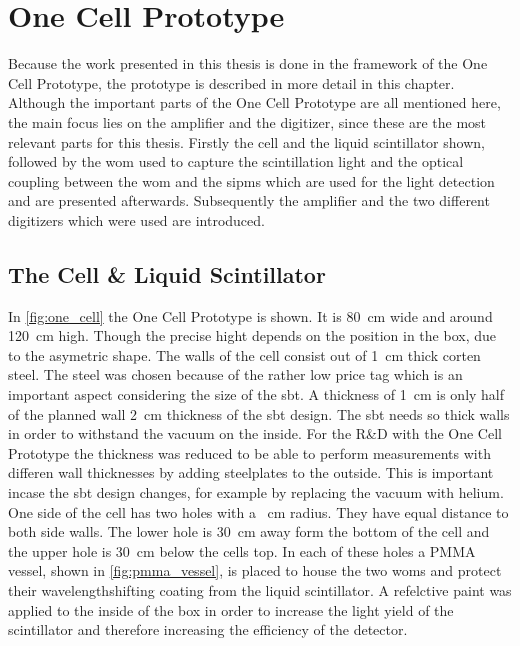 \chapter{One Cell Prototype}

Because the work presented in this thesis is done in the framework of the One Cell Prototype, the prototype is described in more detail in this chapter.
Although the important parts of the One Cell Prototype are all mentioned here, the main focus lies on the amplifier and the digitizer, since these are the most relevant parts for this thesis.
Firstly the cell and the liquid scintillator shown, followed by the \ac{wom} used to capture the scintillation light and the optical coupling between the \ac{wom} and the \acp{sipm} which are used for the light detection and are presented afterwards.
Subsequently the amplifier and the two different digitizers which were used are introduced.



\section{The Cell \& Liquid Scintillator}

In \autoref{fig:one_cell} the One Cell Prototype is shown.
It is \SI{80}{\centi\meter} wide and around \SI{120}{\centi\meter} high.
Though the precise hight depends on the position in the box, due to the asymetric shape.
The walls of the cell consist out of \SI{1}{\centi\meter} thick corten steel.
The steel was chosen because of the rather low price tag which is an important aspect considering the size of the \ac{sbt}.
A thickness of \SI{1}{\centi\meter} is only half of the planned wall \SI{2}{\centi\meter} thickness of the \ac{sbt} design.
The \ac{sbt} needs so thick walls in order to withstand the vacuum on the inside.
For the R\&D with the One Cell Prototype the thickness was reduced to be able to perform measurements with differen wall thicknesses by adding steelplates to the outside.
This is important incase the \ac{sbt} design changes, for example by replacing the vacuum with helium.
One side of the cell has two holes with a \SI{}{\centi\meter} radius.
They have equal distance to both side walls.
The lower hole is \SI{30}{\centi\meter} away form the bottom of the cell and the upper hole is \SI{30}{\centi\meter} below the cells top.
In each of these holes a PMMA vessel, shown in \autoref{fig:pmma_vessel}, is placed to house the two \acp{wom} and protect their wavelengthshifting coating from the liquid scintillator.
A refelctive paint was applied to the inside of the box in order to increase the light yield of the scintillator and therefore increasing the efficiency of the detector.

